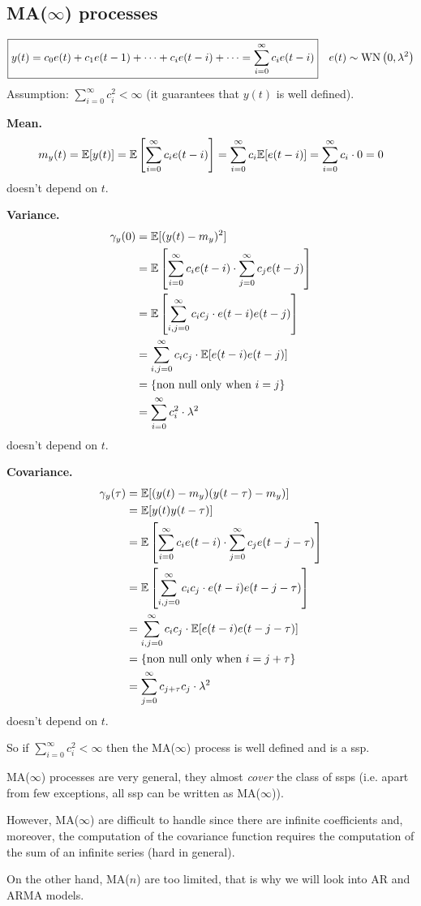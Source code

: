 \subsection{MA(\texorpdfstring{$\infty$}{infinity}) processes}

\[
	\boxed{y(t)=c_{0} e(t)+c_{1} e(t-1)+\cdots+c_{i} e(t-i)+\cdots=\sum_{i=0}^{\infty} c_{i} e(t-i)} \quad e(t) \sim \operatorname{WN}\left(0, \lambda^{2}\right)
\]
Assumption: $\sum_{i=0}^{\infty} c_{i}^{2}<\infty$ (it guarantees that $y(t)$ is well defined).

\textbf{Mean.}
\[
	m_{y}(t)=\mathbb{E}[y(t)]=\mathbb{E}\left[\sum_{i=0}^{\infty} c_{i} e(t-i)\right]=\sum_{i=0}^{\infty} c_{i} \mathbb{E}[e(t-i)]=\sum_{i=0}^{\infty} c_{i} \cdot 0=0
\]
doesn't depend on $t$.

\textbf{Variance.}
\begin{align*}
	\gamma_{y}(0)&=\mathbb{E}[(y(t)-m_{y})^{2}]\\
	&=\mathbb{E}\left[\sum_{i=0}^{\infty} c_{i} e(t-i) \cdot \sum_{j=0}^{\infty} c_{j} e(t-j)\right]\\
	&=\mathbb{E}\left[\sum_{i, j=0}^{\infty} c_{i} c_{j} \cdot e(t-i) e(t-j)\right]\\
	&=\sum_{i, j=0}^{\infty} c_{i} c_{j} \cdot \mathbb{E}[e(t-i) e(t-j)]\\
	&=\{\text{non null only when }i=j\}\\
	&=\sum_{i=0}^{\infty} c_{i}^2 \cdot\lambda^2 
\end{align*}
doesn't depend on $t$.

\textbf{Covariance.}
\begin{align*}
	\gamma_{y}(\tau) &=\mathbb{E}[(y(t)-m_{y}) (y(t-\tau)-m_{y})]\\
	&=\mathbb{E}[y(t) y(t-\tau)]\\
	&=\mathbb{E}\left[\sum_{i=0}^{\infty} c_{i} e(t-i) \cdot \sum_{j=0}^{\infty} c_{j} e(t-j-\tau)\right]\\
	&=\mathbb{E}\left[\sum_{i, j=0}^{\infty} c_{i} c_{j} \cdot e(t-i) e(t-j-\tau)\right]\\
	&=\sum_{i, j=0}^{\infty} c_{i} c_{j} \cdot \mathbb{E}[e(t-i) e(t-j-\tau)]\\
	&=\{\text{non null only when }i=j+\tau\}\\
	&=\sum_{j=0}^{\infty} c_{j+\tau}c_{j}\cdot\lambda^2 
\end{align*}
doesn't depend on $t$.

So if $\sum_{i=0}^{\infty} c_{i}^{2}<\infty$ then the MA($\infty $) process is well defined and is a \gls{ssp}.

\begin{obs}
MA($\infty$) processes are very general, they almost \emph{cover} the class of \glspl{ssp} (i.e. apart from few exceptions, all \gls{ssp} can be written as MA($\infty$)).

However, MA($\infty$) are difficult to handle since there are infinite coefficients and, moreover, the computation of the covariance function requires the computation of the sum of an infinite series (hard in general).

On the other hand, MA($n$) are too limited, that is why we will look into AR and ARMA models.
\end{obs}